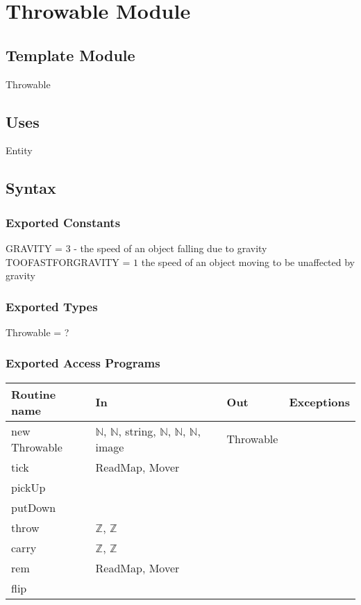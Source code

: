 \documentclass[12pt]{article}
\begin{document}
\newpage

\section*{Throwable Module}

\subsection*{Template Module}

Throwable

\subsection*{Uses}

Entity

\subsection*{Syntax}

\subsubsection*{Exported Constants}

GRAVITY = $3$ - the speed of an object falling due to gravity\\
TOOFASTFORGRAVITY = $1$ the speed of an object moving to be unaffected by gravity\\

\subsubsection*{Exported Types}

Throwable = ?

\subsubsection*{Exported Access Programs}

\begin{tabular}{| l | l | l | l |}
\hline
\textbf{Routine name} & \textbf{In} & \textbf{Out} & \textbf{Exceptions}\\
\hline
new Throwable & $\mathbb{N}$, $\mathbb{N}$, string, $\mathbb{N}$, $\mathbb{N}$, $\mathbb{N}$, image & Throwable & ~\\
\hline
tick & ReadMap, Mover & ~ & ~\\
\hline
pickUp & ~ & ~ & ~\\
\hline
putDown & ~ & ~ & ~\\
\hline
throw & $\mathbb{Z}$, $\mathbb{Z}$ & ~ & ~\\
\hline
carry & $\mathbb{Z}$, $\mathbb{Z}$ & ~ & ~\\
\hline
rem & ReadMap, Mover & ~ & ~\\
\hline
flip & ~ & ~ & ~\\
\hline
\end{tabular}
\end{document}
